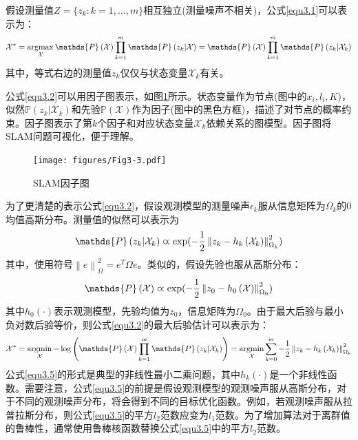 假设测量值$Z=\lbrace z_k:k=1,\ldots ,m\rbrace$相互独立(测量噪声不相关)，公式\eqref{equ3.1}可以表示为：
\begin{equation}
\label{equ3.2}
\mathcal{X}^* 
= 
\argmax \limits_{\mathcal{X}} \mathds{P}\left(\mathcal{X}\right) \prod \limits_{k=1}^{m} \mathds{P}\left(z_k \vert \mathcal{X}  \right)
=
\mathds{P}\left(\mathcal{X}\right) \prod \limits_{k=1}^{m} \mathds{P}\left(z_k \vert \mathcal{X}_k  \right)
\end{equation}
其中，等式右边的测量值$z_k$仅仅与状态变量$\mathcal{X}_k$有关。

公式\eqref{equ3.2}可以用因子图\upcite{[3.3]}表示，如图\ref{fig3.3}所示。状态变量作为节点(图中的$x_i,l_i,K$)，似然$\mathds{P}\left(z_k \vert \mathcal{X}_k  \right)$和先验$\mathds{P}\left(\mathcal{X} \right)$作为因子(图中的黑色方框)，描述了对节点的概率约束。因子图表示了第$k$个因子和对应状态变量$\mathcal{X}_k$依赖关系的图模型。因子图将SLAM问题可视化，便于理解。

\begin{figure}
\centering
\texttt{[image: figures/Fig3-3.pdf]}
\caption{SLAM因子图}
\label{fig3.3}
\end{figure}


为了更清楚的表示公式\eqref{equ3.2}，假设观测模型的测量噪声$\epsilon_k$服从信息矩阵为$\Omega_k$的0均值高斯分布。测量值的似然可以表示为
\begin{equation}
\label{equ3.3}
\mathds{P}\left(z_k \vert \mathcal{X}_k  \right) \varpropto \exp ( -{1 \over 2} \left\| z_k -  h_k\left( \mathcal{X}_k \right) \right\|_{\Omega_k}^2 )
\end{equation}
其中，使用符号$\left\| e \right\|_{\Omega}^2 = e^T \Omega e$。类似的，假设先验也服从高斯分布：
\begin{equation}
\label{equ3.4}
\mathds{P}\left( \mathcal{X}  \right) \varpropto \exp ( -{1 \over 2} \left\| z_0 - h_0\left(  \mathcal{X} \right)  \right\|_{\Omega_0}^2 )
\end{equation}
其中$h_0(\cdot)$表示观测模型，先验均值为$z_0$，信息矩阵为$\Omega_0$。由于最大后验与最小负对数后验等价，则公式\eqref{equ3.2}的最大后验估计可以表示为：
\begin{equation}
\label{equ3.5}
\mathcal{X}^* 
=
\argmin \limits_{\mathcal{X}} - \log \left( \mathds{P}\left(\mathcal{X}\right) \prod \limits_{k=1}^{m} \mathds{P}\left(z_k \vert \mathcal{X}_k  \right) \right)
=
\argmin \limits_{\mathcal{X}} \sum \limits_{k=0}^{m} -{1 \over 2} \left\|  z_k - h_k\left(   \mathcal{X}_k \right)  \right\|_{\Omega_k}^2
\end{equation}
公式\eqref{equ3.5}的形式是典型的非线性最小二乘问题，其中$h_k(\cdot)$是一个非线性函数。需要注意，公式\eqref{equ3.5}的前提是假设观测模型的观测噪声服从高斯分布，对于不同的观测噪声分布，将会得到不同的目标优化函数。例如，若观测噪声服从拉普拉斯分布，则公式\eqref{equ3.5}的平方$l_2$范数应变为$l_1$范数。为了增加算法对于离群值的鲁棒性，通常使用鲁棒核函数\upcite{[3.4]}替换公式\eqref{equ3.5}中的平方$l_2$范数。


